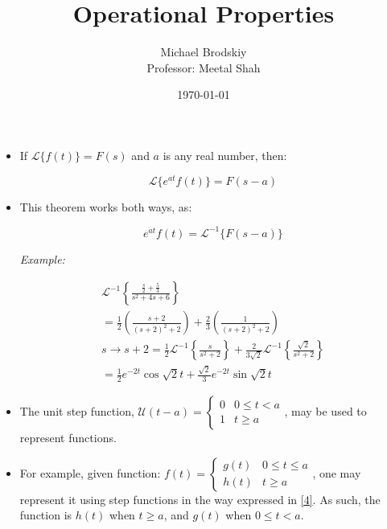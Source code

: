 \documentclass[12pt]{article}
\title{Operational Properties}
\date{\today}
\author{Michael Brodskiy\\ \small Professor: Meetal Shah}
\begin{document}
\maketitle

\begin{itemize}

  \item If $\mathcal{L}\{f(t)\}=F(s)$ and $a$ is any real number, then:

    \begin{equation}
      \mathcal{L}\{e^{at}f(t)\}=F(s-a)
      \label{1}
    \end{equation}

  \item This theorem works both ways, as:

    \begin{equation}
      e^{at}f(t)=\mathcal{L}^{-1}\{F(s-a)\}
      \label{2}
    \end{equation}

    \textit{Example:}

    \begin{equation}
      \begin{split}
        \mathcal{L}^{-1}\left\{ \frac{\frac{s}{2}+\frac{5}{3}}{s^2+4s+6} \right\}\\
        =\frac{1}{2}\left( \frac{s+2}{(s+2)^2+2} \right)+\frac{2}{3}\left( \frac{1}{(s+2)^2+2} \right)\\
        s\to s+2=\frac{1}{2}\mathcal{L}^{-1}\left\{ \frac{s}{s^2+2} \right\}+\frac{2}{3\sqrt{2}}\mathcal{L}^{-1}\left\{ \frac{\sqrt{2}}{s^2+2}  \right\}\\
          =\frac{1}{2}e^{-2t}\cos \sqrt{2}t+\frac{\sqrt{2}}{3}e^{-2t}\sin\sqrt{2}t
      \end{split}
      \label{3}
    \end{equation}

  \item The unit step function, $\mathcal{U}(t-a)=\left\{\begin{array}{ll} 0 & 0\leq t< a\\ 1 & t\geq a \end{array}$, may be used to represent functions.

    \item For example, given function: $f(t)=\left\{\begin{array}{ll} g(t) & 0\leq t\leq a\\ h(t) & t\geq a \end{array}$, one may represent it using step functions in the way expressed in \eqref{4}. As such, the function is $h(t)$ when $t\geq a$, and $g(t)$ when $0\leq t< a$.


\end{itemize}
\end{document}
